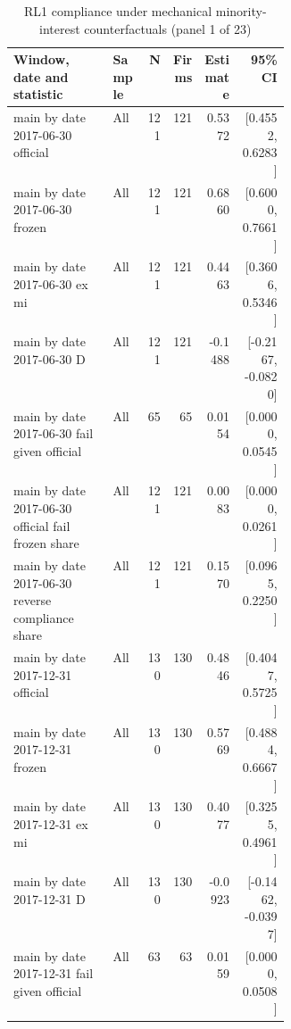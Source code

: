 \begin{table}[!htbp]\centering\scriptsize
\caption{RL1 compliance under mechanical minority-interest counterfactuals (panel 1 of 23)}
\begin{threeparttable}
\begin{tabular}{p{0.36\linewidth}lrrrr}
\toprule
Window, date and statistic & Sample & N & Firms & Estimate & 95\% CI \\
\midrule
main by date 2017-06-30 official & All & 121 & 121 & 0.5372 & [0.4552, 0.6283] \\
main by date 2017-06-30 frozen & All & 121 & 121 & 0.6860 & [0.6000, 0.7661] \\
main by date 2017-06-30 ex mi & All & 121 & 121 & 0.4463 & [0.3606, 0.5346] \\
main by date 2017-06-30 D & All & 121 & 121 & -0.1488 & [-0.2167, -0.0820] \\
main by date 2017-06-30 fail given official & All & 65 & 65 & 0.0154 & [0.0000, 0.0545] \\
main by date 2017-06-30 official fail frozen share & All & 121 & 121 & 0.0083 & [0.0000, 0.0261] \\
main by date 2017-06-30 reverse compliance share & All & 121 & 121 & 0.1570 & [0.0965, 0.2250] \\
main by date 2017-12-31 official & All & 130 & 130 & 0.4846 & [0.4047, 0.5725] \\
main by date 2017-12-31 frozen & All & 130 & 130 & 0.5769 & [0.4884, 0.6667] \\
main by date 2017-12-31 ex mi & All & 130 & 130 & 0.4077 & [0.3255, 0.4961] \\
main by date 2017-12-31 D & All & 130 & 130 & -0.0923 & [-0.1462, -0.0397] \\
main by date 2017-12-31 fail given official & All & 63 & 63 & 0.0159 & [0.0000, 0.0508] \\
\bottomrule
\end{tabular}
\begin{tablenotes}[flushleft]\footnotesize

\end{tablenotes}
\end{threeparttable}
\end{table}
